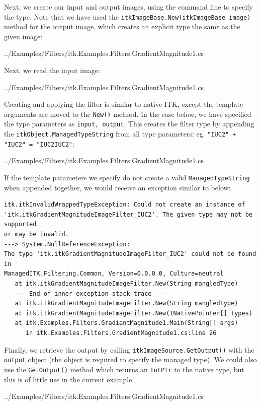 \documentclass{InsightArticle}
\def\code#1{\texttt{#1}}
\begin{document}
Next, we create our input and output images, using the command line to specify the type.
Note that we have used the \code{itkImageBase.New(itkImageBase image)} method for the output
image, which creates an explicit type the same as the given image:
\begin{center}
	
	{../Examples/Filters/itk.Examples.Filters.GradientMagnitude1.cs}
\end{center}

Next, we read the input image:
\begin{center}
	
	{../Examples/Filters/itk.Examples.Filters.GradientMagnitude1.cs}
\end{center}

Creating and applying the filter is similar to native ITK, except the template arguments
are moved to the \code{New()} method. In the case below, we have specified the type
parameters as \code{input, output}. This creates the filter type by appending the 
\code{itkObject.ManagedTypeString} from all type parameters: 
eg. \code{"IUC2" + "IUC2" = "IUC2IUC2"}:
\begin{center}
	
	{../Examples/Filters/itk.Examples.Filters.GradientMagnitude1.cs}
\end{center}

If  the template parameters we specify do not create a valid \code{ManagedTypeString}
when appended together, we would receive an exception similar to below:
\begin{lstlisting}
itk.itkInvalidWrappedTypeException: Could not create an instance of
'itk.itkGradientMagnitudeImageFilter_IUC2'. The given type may not be supported
or may be invalid. 
---> System.NullReferenceException:
The type 'itk.itkGradientMagnitudeImageFilter_IUC2' could not be found in
ManagedITK.Filtering.Common, Version=0.0.0.0, Culture=neutral
   at itk.itkGradientMagnitudeImageFilter.New(String mangledType)
   --- End of inner exception stack trace ---
   at itk.itkGradientMagnitudeImageFilter.New(String mangledType)
   at itk.itkGradientMagnitudeImageFilter.New(INativePointer[] types)
   at itk.Examples.Filters.GradientMagnitude1.Main(String[] args)
      in itk.Examples.Filters.GradientMagnitude1.cs:line 26
\end{lstlisting}

Finally, we retrieve the output by calling \code{itkImageSource.GetOutput()}
with the \code{output} object (the object is required to specify the managed type).
We could also use the \code{GetOutput()} method which returns an \code{IntPtr} to
the native type, but this is of little use in the current example.
\begin{center}
	
	{../Examples/Filters/itk.Examples.Filters.GradientMagnitude1.cs}
\end{center}
\end{document}
